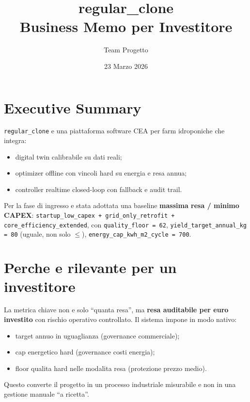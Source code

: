 \documentclass[11pt,a4paper]{article}
\title{\textbf{regular\_clone}\\Business Memo per Investitore}
\author{Team Progetto}
\date{23 Marzo 2026}
\begin{document}
\maketitle

\section*{Executive Summary}
\texttt{regular\_clone} e una piattaforma software CEA per farm idroponiche che integra:
\begin{itemize}
  \item digital twin calibrabile su dati reali;
  \item optimizer offline con vincoli hard su energia e resa annua;
  \item controller realtime closed-loop con fallback e audit trail.
\end{itemize}
Per la fase di ingresso e stata adottata una baseline \textbf{massima resa / minimo CAPEX}:
\texttt{startup\_low\_capex + grid\_only\_retrofit + core\_efficiency\_extended}, con
\texttt{quality\_floor = 62}, \texttt{yield\_target\_annual\_kg = 80} (uguale, non solo \(\le\)),
\texttt{energy\_cap\_kwh\_m2\_cycle = 700}.

\section*{Perche e rilevante per un investitore}
La metrica chiave non e solo ``quanta resa'', ma \textbf{resa auditabile per euro investito} con rischio operativo controllato.
Il sistema impone in modo nativo:
\begin{itemize}
  \item target annuo in uguaglianza (governance commerciale);
  \item cap energetico hard (governance costi energia);
  \item floor qualita hard nelle modalita resa (protezione prezzo medio).
\end{itemize}
Questo converte il progetto in un processo industriale misurabile e non in una gestione manuale ``a ricetta''.
\end{document}
